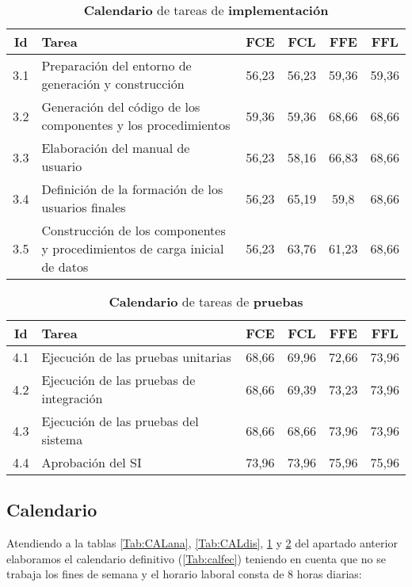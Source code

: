 \documentclass[11pt,a4paper,spanish,twoside]{report}
\begin{document}
\begin{table}[!h]
  \centering
  \begin{tabular}{|c||p{5.3cm}||c|c|c|c|}
    \hline
    \textbf{Id} & \textbf{Tarea} & \textbf{FCE} & \textbf{FCL} &
    \textbf{FFE} & \textbf{FFL}\\
    \hline
    3.1 & Preparación del entorno de generación y construcción & 56,23 &
    56,23 & 59,36 & 59,36\\ 
    \hline
    3.2 & Generación del código de los componentes y los procedimientos
    &59,36 & 59,36 & 68,66 & 68,66\\ 
    \hline
    3.3 & Elaboración del manual de usuario & 56,23 & 58,16 & 66,83 & 68,66\\
    \hline
    3.4 & Definición de la formación de los usuarios finales & 56,23 &
    65,19 & 59,8 & 68,66\\ 
    \hline
    3.5 & Construcción de los componentes y procedimientos de carga inicial
    de datos & 56,23 & 63,76 & 61,23 & 68,66\\
    \hline
  \end{tabular}
  \caption{\textbf{Calendario} de tareas de \textbf{implementación}}
  \label{Tab:CALimp}
\end{table}
    
\begin{table}[!h]
  \centering
  \begin{tabular}{|c||p{5.3cm}||c|c|c|c|}
    \hline
    \textbf{Id} & \textbf{Tarea} & \textbf{FCE} & \textbf{FCL} &
    \textbf{FFE} & \textbf{FFL}\\
    \hline
    4.1 & Ejecución de las pruebas unitarias & 68,66 & 69,96 & 72,66 & 73,96\\
    \hline
    4.2 & Ejecución de las pruebas de integración & 68,66 & 69,39 & 73,23 &
    73,96\\ 
    \hline
    4.3 & Ejecución de las pruebas del sistema & 68,66 & 68,66 & 73,96 &
    73,96 \\ 
    \hline
    4.4 & Aprobación del SI & 73,96 & 73,96 & 75,96 & 75,96\\
    \hline
  \end{tabular}
  \caption{\textbf{Calendario} de tareas de \textbf{pruebas}}
  \label{Tab:CALpru}
\end{table}


\subsection{Calendario}
Atendiendo a la tablas \ref{Tab:CALana}, \ref{Tab:CALdis}, \ref{Tab:CALimp} y
\ref{Tab:CALpru} del apartado anterior elaboramos el calendario definitivo
(\ref{Tab:calfec}) teniendo en cuenta que no se trabaja los fines de semana y
el horario laboral consta de 8 horas diarias:
 
\end{document}
